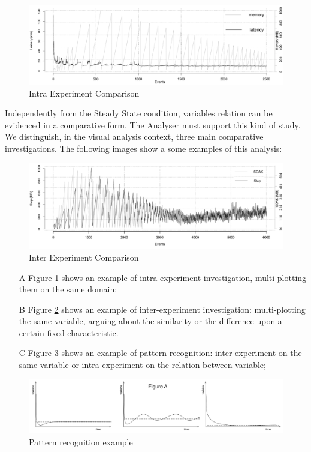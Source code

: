 \begin{figure}[tbh]
  \centering
	\includegraphics[width=0.80\linewidth]{images/comp-intra}
	\caption{Intra Experiment Comparison} 
  	\label{fig:comp-intra}
\end{figure}

Independently from the Steady State condition, variables relation can be evidenced in a comparative form. The Analyser must support this kind of study. We distinguish, in the visual analysis context, three main comparative investigations. The following images show a some examples of this analysis:

\begin{figure}[tbh]
  \centering
	\includegraphics[width=0.80\linewidth]{images/comp-inter}
	\caption{Inter Experiment Comparison} 
  	\label{fig:comp-inter}
\end{figure}

\begin{enumerate}
\item[A] Figure \ref{fig:comp-intra} shows an example of intra-experiment investigation, multi-plotting them on the same domain; 
\item[B] Figure \ref{fig:comp-inter} shows an example of inter-experiment investigation: multi-plotting the same variable, arguing about the similarity or the difference upon a certain fixed characteristic.  
\item[C] Figure \ref{fig:patterns}  shows an example of pattern recognition: inter-experiment on the same variable or intra-experiment on the relation between variable;
\end{enumerate}

\begin{figure}[tbh]
  \centering
	\includegraphics[width=0.80\linewidth]{images/patterns}
	\caption{Pattern recognition example} 
  	\label{fig:patterns}
\end{figure}

